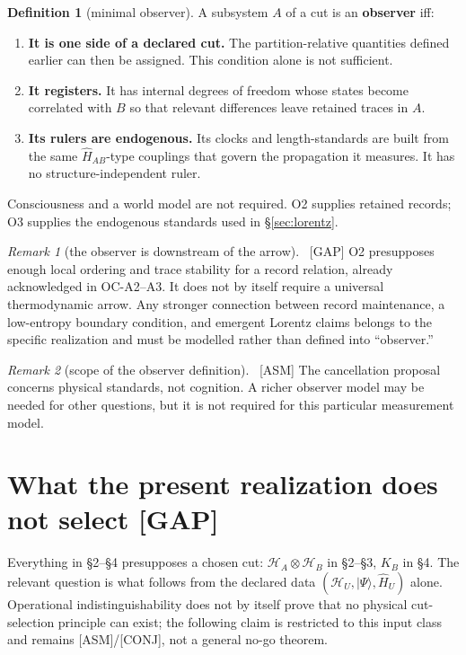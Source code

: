 \documentclass[11pt]{article}
\newcommand{\asm}{\textcolor{blue!70!black}{\textsf{\small[ASM]}}}
\newcommand{\conj}{\textcolor{orange!80!black}{\textsf{\small[CONJ]}}}
\newcommand{\post}{\textcolor{purple!70!black}{\textsf{\small[POST]}}}
\newcommand{\gap}{\textcolor{red!75!black}{\textsf{\small[GAP]}}}
\def\conj{[CONJ]}\def\post{[POST]}\def\gap{[GAP]}%
\def\quad{ }\def\normalsize{}%
\theoremstyle{definition}
\newtheorem{definition}{Definition}[section]
\theoremstyle{remark}
\newtheorem*{remark}{Remark}
\begin{document}
\begin{definition}[minimal observer]\label{def:observer}
A subsystem $A$ of a cut is an \textbf{observer} iff:
\begin{enumerate}[leftmargin=1.6em, itemsep=1pt, topsep=2pt]
  \item[\textbf{O1}] \textbf{It is one side of a declared cut.} The partition-relative quantities defined earlier can then be assigned. This condition alone is not sufficient.
  \item[\textbf{O2}] \textbf{It registers.} It has internal degrees of freedom whose states become correlated with $B$ so that relevant differences leave retained traces in $A$.
  \item[\textbf{O3}] \textbf{Its rulers are endogenous.} Its clocks and length-standards are built from the same $\hat{H}_{AB}$-type couplings that govern the propagation it measures. It has no structure-independent ruler.
\end{enumerate}
\end{definition}

\noindent Consciousness and a world model are not required. O2 supplies retained records; O3 supplies the endogenous standards used in \S\ref{sec:lorentz}.

\begin{remark}[the observer is downstream of the arrow]{\normalfont\ \gap}
O2 presupposes enough local ordering and trace stability for a record relation, already acknowledged in OC-A2--A3. It does not by itself require a universal thermodynamic arrow. Any stronger connection between record maintenance, a low-entropy boundary condition, and emergent Lorentz claims belongs to the specific realization and must be modelled rather than defined into ``observer.''
\end{remark}

\begin{remark}[scope of the observer definition]{\normalfont\ \asm}
The cancellation proposal concerns physical standards, not cognition. A richer observer model may be needed for other questions, but it is not required for this particular measurement model.
\end{remark}

\section{What the present realization does not select \quad{\normalsize\gap}\label{sec:select}}

Everything in \S2--\S4 presupposes a chosen cut: $\mathcal{H}_A\otimes\mathcal{H}_B$ in \S2--\S3, $K_B$ in \S4. The relevant question is what follows from the declared data $(\mathcal{H}_U,\lvert\Psi\rangle,\hat H_U)$ alone. Operational indistinguishability does not by itself prove that no physical cut-selection principle can exist; the following claim is restricted to this input class and remains \asm/\conj, not a general no-go theorem.
\end{document}
